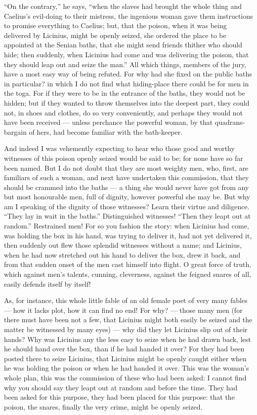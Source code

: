  ``On the contrary,'' he says, ``when the slaves had brought the whole thing and Caelius's evil-doing to their mistress, the ingenious woman gave them instructions to promise everything to Caelius; but, that the poison, when it was being delivered by Licinius, might be openly seized, she ordered the place to be appointed at the Senian baths, that she might send friends thither who should hide; then suddenly, when Licinius had come and was delivering the poison, that they should leap out and seize the man.'' All which things, members of the jury, have a most easy way of being refuted. For why had she fixed on the public baths in particular? in which I do not find what hiding-place there could be for men in the toga. For if they were to be in the entrance of the baths, they would not be hidden; but if they wanted to throw themselves into the deepest part, they could not, in shoes and clothes, do so very conveniently, and perhaps they would not have been received --- unless perchance the powerful woman, by that quadrans-bargain of hers, had become familiar with the bath-keeper.

 And indeed I was vehemently expecting to hear who those good and worthy witnesses of this poison openly seized would be said to be; for none have so far been named. But I do not doubt that they are most weighty men, who, first, are familiars of such a woman, and next have undertaken this commission, that they should be crammed into the baths --- a thing she would never have got from any but most honourable men, full of dignity, however powerful she may be. But why am I speaking of the dignity of those witnesses? Learn their virtue and diligence. ``They lay in wait in the baths.'' Distinguished witnesses! ``Then they leapt out at random.'' Restrained men! For so you fashion the story: when Licinius had come, was holding the box in his hand, was trying to deliver it, had not yet delivered it, then suddenly out flew those splendid witnesses without a name; and Licinius, when he had now stretched out his hand to deliver the box, drew it back, and from that sudden onset of the men cast himself into flight. O great force of truth, which against men's talents, cunning, cleverness, against the feigned snares of all, easily defends itself by itself!

 As, for instance, this whole little fable of an old female poet of very many fables --- how it lacks plot, how it can find no end! For why? --- those many men (for there must have been not a few, that Licinius might both easily be seized and the matter be witnessed by many eyes) --- why did they let Licinius slip out of their hands? Why was Licinius any the less easy to seize when he had drawn back, lest he should hand over the box, than if he had handed it over? For they had been posted there to seize Licinius, that Licinius might be openly caught either when he was holding the poison or when he had handed it over. This was the woman's whole plan, this was the commission of these who had been asked: I cannot find why you should say they leapt out at random and before the time. They had been asked for this purpose, they had been placed for this purpose: that the poison, the snares, finally the very crime, might be openly seized.

